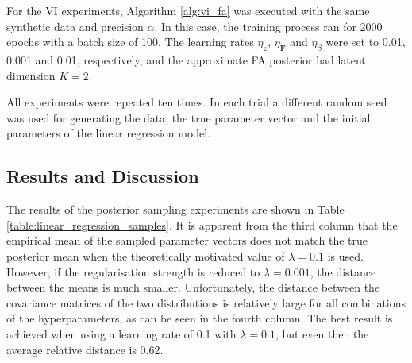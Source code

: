 \documentclass[msc,deptreport.inf]{infthesis} %
\newcommand{\matr}[1]{\mathbf{#1}}
\begin{document}
For the VI experiments, Algorithm \ref{alg:vi_fa} was executed with the same synthetic data and precision $\alpha$. In this case, the training process ran for 2000 epochs with a batch size of 100. The learning rates $\eta_\matr{c}$,  $\eta_\matr{F}$ and $\eta_\beta$ were set to 0.01, 0.001 and 0.01, respectively, and the approximate FA posterior had latent dimension $K=2$. 

All experiments were repeated ten times. In each trial a different random seed was used for generating the data, the true parameter vector and the initial parameters of the linear regression model. 

\subsection{Results and Discussion}

The results of the posterior sampling experiments are shown in Table \ref{table:linear_regression_samples}. It is apparent from the third column that the empirical mean of the sampled parameter vectors does not match the true posterior mean when the theoretically motivated value of $\lambda = 0.1$ is used. However, if the regularisation strength is reduced to $\lambda = 0.001$, the distance between the means is much smaller. Unfortunately, the distance between the covariance matrices of the two distributions is relatively large for all combinations of the hyperparameters, as can be seen in the fourth column. The best result is achieved when using a learning rate of 0.1 with $\lambda = 0.1$, but even then the average relative distance is 0.62. 
\end{document}
